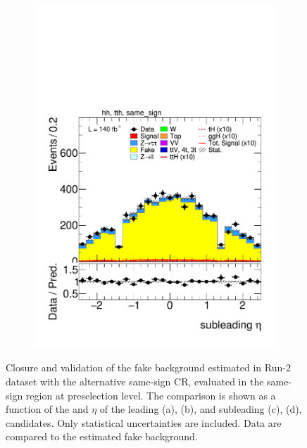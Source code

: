 \begin{figure}[htbp]
\begin{subfigure}[b]{0.45\textwidth}
      \includegraphics[width=\textwidth]{images/same_sign_same_sign_run2/plot_tau_1_eta_hh_tth_15_16_17_18_same_sign.pdf}
      \caption{}
    \end{subfigure}

    \caption{
    Closure and validation of the fake \tauhad background estimated in Run-2 dataset with the alternative same-sign \tauhadhad CR, evaluated in the same-sign region at preselection level.
    The comparison is shown as a function of the \pt and $\eta$ of the leading (a), (b), and subleading (c), (d), \tauhad candidates. Only statistical uncertainties are included.
    Data are compared to the estimated fake \tauhad background.
  }
  \label{fig:closure_validation_same_sign_run2}
\end{figure}

